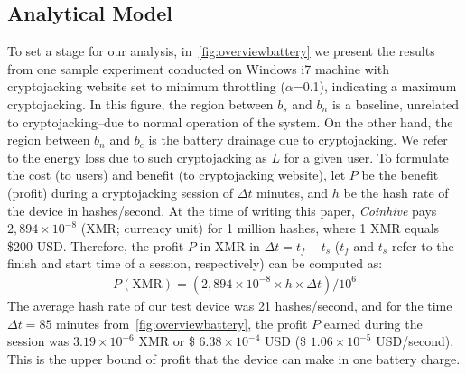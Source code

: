 \documentclass[acmlarge]{acmart}
\newcommand{\ch}{{\em Coinhive}\xspace}
\newcommand{\cj}{cryptojacking\xspace}
\begin{document}
\subsection{Analytical Model}\label{sec:ana}
To set a stage for our analysis, in~\autoref{fig:overviewbattery} we present the results from one sample experiment conducted on Windows i7 machine with \cj website set to minimum throttling ($\alpha$=0.1), indicating a maximum \cj. In this figure, the region between $b_s$ and $b_n$ is a baseline, unrelated to \cj--due to normal operation of the system. On the other hand, the region between $b_n$ and $b_c$ is the battery drainage due to \cj. We refer to the energy loss due to such \cj as $L$ for a given user. To formulate the cost (to users) and benefit (to \cj website), let $P$ be the benefit (profit) during a \cj session of $\Delta t$ minutes, and $h$ be the hash rate of the device in hashes/second. At the time of writing this paper, \ch pays $2,894 \times 10^{-8}$ (XMR; currency unit) for 1 million hashes, where 1 XMR equals \$200 USD. Therefore, the profit $P$ in XMR in $\Delta{t}=  t_f - t_s$ ($t_f$ and $t_s$ refer to the finish and start time of a session, respectively) can be computed as:    
\begin{eqnarray} 
  \label{equ:profit}  P (\text{XMR}) = ({2,894 \times 10^{-8} \times h \times \Delta{t}}) / {10^{6}}
\end{eqnarray} 
The average hash rate of our test device was 21 hashes/second, and for the time  $\Delta{t}=85$ minutes from~\autoref{fig:overviewbattery}, the profit $P$ earned during the session was $3.19 \times 10^{-6}$ XMR or \$ $6.38 \times 10^{-4}$ USD (\$ $1.06 \times 10^{-5}$ USD/second).  This is the upper bound of profit that the device can make in one battery charge. 
\end{document}
